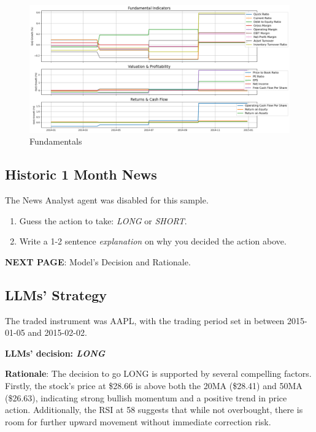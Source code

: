 \documentclass[8pt]{scrartcl}
\begin{document}
\begin{figure}[H]
    \centering
    \includegraphics[width=1\linewidth]{judge_reviews/AAPL_M_gpt-4o-mini/2015-01-01/judge_Fundamental_Indicators.png}
    \caption{Fundamentals}
\end{figure}


\subsection*{Historic 1 Month News}

The News Analyst agent was disabled for this sample.

\begin{tcolorbox}[colback=blue!10, colframe=blue!60, title=\textbf{TASKS}, sharp corners=southwest]
\begin{enumerate}
    \item Guess the action to take: \textit{LONG} or \textit{SHORT}.
    \item Write a 1-2 sentence \textit{explanation} on why you decided the action above.
\end{enumerate}
\end{tcolorbox}

\textbf{NEXT PAGE}: Model's Decision and Rationale.

\newpage

\subsection*{LLMs' Strategy} \label{strategy9}

The traded instrument was AAPL, with the trading period set in between 2015-01-05 and 2015-02-02.

\textbf{LLMs' decision: \textit{LONG}}

\textbf{Rationale}: The decision to go LONG is supported by several compelling factors. Firstly, the stock's price at \$28.66 is above both the 20MA (\$28.41) and 50MA (\$26.63), indicating strong bullish momentum and a positive trend in price action. Additionally, the RSI at 58 suggests that while not overbought, there is room for further upward movement without immediate correction risk.
\end{document}
